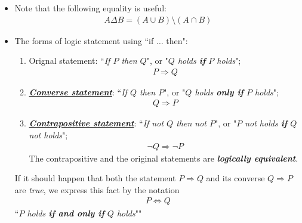 \documentclass[11pt]{article}
\begin{document}
\begin{itemize}
\item \begin{remark}
Note that the following equality is useful:
\begin{align*}
A \Delta B = (A \cup B) \setminus (A \cap B)
\end{align*}
\end{remark}

\item The forms of logic statement using ``if $\ldots$ then":
\begin{enumerate}
\item Orignal statement: ``\emph{If $P$ then $Q$}", or "\emph{$Q$ holds \textbf{if} $P$ holds}";
\begin{align*}
P \Rightarrow Q
\end{align*}
\item \underline{\emph{\textbf{Converse statement}}}: ``\emph{If $Q$ then $P$}", or "\emph{$Q$ holds \textbf{only if} $P$ holds}";
\begin{align*}
Q \Rightarrow P
\end{align*}
\item \underline{\emph{\textbf{Contrapositive statement}}}: ``\emph{If not $Q$ then not $P$}", or "\emph{$P$ not holds \textbf{if} $Q$ not holds}";
\begin{align*}
\neg Q \Rightarrow \neg P
\end{align*} The contrapositive and the original statements are  \emph{\textbf{logically equivalent}}.
\end{enumerate}
If it should happen that both the statement $P \Rightarrow Q$ and its converse $Q \Rightarrow P$ are \emph{true}, we express this fact by the notation 
\begin{align*}
P \Leftrightarrow Q
\end{align*} ``\emph{$P$ holds \textbf{if and only if} $Q$ holds}""
\end{itemize}
\end{document}
